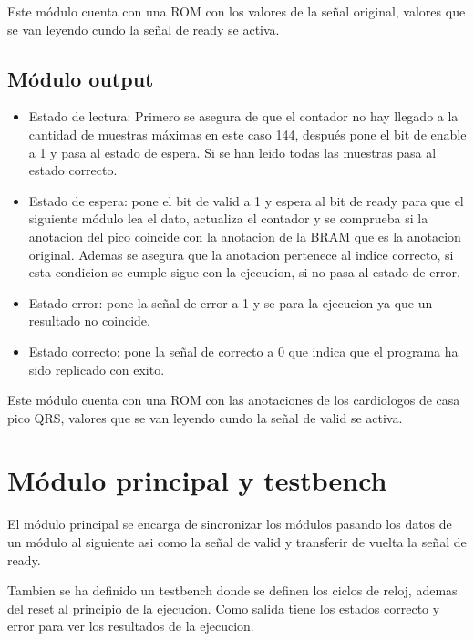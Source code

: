 Este módulo cuenta con una ROM con los valores de la señal original, valores que se van leyendo cundo la señal de ready se activa.

\subsection{Módulo output}
\begin{itemize}
    \item Estado de lectura: Primero se asegura de que el contador no hay llegado a la cantidad de muestras máximas en este caso 144, después pone el bit de enable a 1 
    y pasa al estado de espera. Si se han leido todas las muestras pasa al estado correcto.
    \item Estado de espera: pone el bit de valid a 1 y espera al bit de ready para que el siguiente módulo lea el dato, actualiza el contador y se comprueba si la anotacion
    del pico coincide con la anotacion de la BRAM que es la anotacion original. Ademas se asegura que la anotacion pertenece al indice correcto, si esta condicion se cumple
    sigue con la ejecucion, si no pasa al estado de error.
    \item Estado error: pone la señal de error a 1 y se para la ejecucion ya que un resultado no coincide.
    \item Estado correcto: pone la señal de correcto a 0 que indica que el programa ha sido replicado con exito.
\end{itemize}

Este módulo cuenta con una ROM con las anotaciones de los cardiologos de casa pico QRS, valores que se van leyendo cundo la señal de valid se activa.

\section{Módulo principal y testbench}

El módulo principal se encarga de sincronizar los módulos pasando los datos de un módulo al siguiente asi como la señal de valid y transferir de vuelta la señal de ready.

Tambien se ha definido un testbench donde se definen los ciclos de reloj, ademas del reset al principio de la ejecucion. Como salida tiene los estados correcto y error para 
ver los resultados de la ejecucion.


